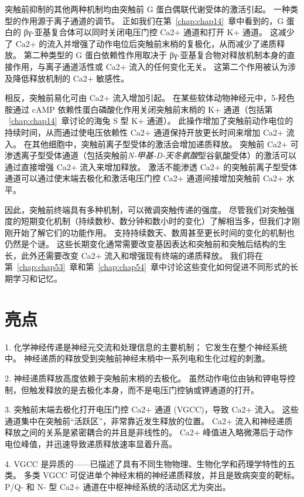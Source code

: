 突触前抑制的其他两种机制均由突触前 G 蛋白偶联代谢受体的激活引起。
一种类型的作用源于离子通道的调节。
正如我们在第~\ref{chap:chap14}~章中看到的，G 蛋白的 βγ-亚基复合体可以同时关闭电压门控 Ca2+ 通道和打开 K+ 通道。
这减少了 Ca2+ 的流入并增强了动作电位后突触前末梢的复极化，从而减少了递质释放。
第二种类型的 G 蛋白依赖性作用取决于 βγ-亚基复合物对释放机制本身的直接作用，与离子通道活性或 Ca2+ 流入的任何变化无关。
这第二个作用被认为涉及降低释放机制的 Ca2+ 敏感性。


相反，突触前易化可由 Ca2+ 流入增加引起。
在某些软体动物神经元中，5-羟色胺通过 cAMP 依赖性蛋白磷酸化作用关闭突触前末梢的 K+ 通道（包括第 ~\ref{chap:chap14}~章讨论的海兔 S 型 K+ 通道）。
此操作增加了突触前动作电位的持续时间，从而通过使电压依赖性 Ca2+ 通道保持开放更长时间来增加 Ca2+ 流入。
在其他细胞中，突触前离子型受体的激活会增加递质释放。
突触前 Ca2+ 可渗透离子型受体通道（包括突触前\textit{N-甲基-D-天冬氨酸}型谷氨酸受体）的激活可以通过直接增强 Ca2+ 流入来增加释放。
激活不能渗透 Ca2+ 的突触前离子型受体通道可以通过使末端去极化和激活电压门控 Ca2+ 通道间接增加突触前 Ca2+ 水平。


因此，突触前终端具有多种机制，可以微调突触传递的强度。
尽管我们对突触强度的短期变化机制（持续数秒、数分钟和数小时的变化）了解相当多，但我们才刚刚开始了解它们的功能作用。
支持持续数天、数周甚至更长时间的变化的机制也仍然是个谜。
这些长期变化通常需要改变基因表达和突触前和突触后结构的生长，此外还需要改变 Ca2+ 流入和增强现有终端的递质释放。
我们将在第~\ref{chap:chap53}~章和第~\ref{chap:chap54}~章中讨论这些变化如何促进不同形式的长期学习和记忆。



\section{亮点}

1. 化学神经传递是神经元交流和处理信息的主要机制； 它发生在整个神经系统中。
神经递质的释放受到突触前神经末梢中一系列电和生化过程的刺激。 


2. 神经递质释放高度依赖于突触前末梢的去极化。
虽然动作电位由钠和钾电导控制，但触发释放的是去极化本身，而不是电压门控钠或钾通道的打开。 


3. 突触前末端去极化打开电压门控 Ca2+ 通道 (VGCC)，导致 Ca2+ 流入。
这些通道集中在突触前“活跃区”，非常靠近发生释放的位置。
Ca2+ 流入和神经递质释放之间的关系是紧密耦合的并且是非线性的。
Ca2+ 峰值进入略微滞后于动作电位峰值，并迅速导致递质释放速率显着升高。 


4. VGCC 是异质的——已描述了具有不同生物物理、生物化学和药理学特性的五类。
多类 VGCC 可促进单个神经末梢的神经递质释放，并且是致病突变的靶标。
P/Q- 和 N- 型 Ca2+ 通道在中枢神经系统的活动区尤为突出。 


